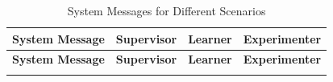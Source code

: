 \begin{longtable}{|>{\raggedright\arraybackslash}p{3cm}|>{\raggedright\arraybackslash}p{3.5cm}|>{\raggedright\arraybackslash}p{3.5cm}|>{\raggedright\arraybackslash}p{3.5cm}|}
\caption{System Messages for Different Scenarios} \label{tab:system_messages} \\

\hline
\textbf{System Message} & \textbf{Supervisor} & \textbf{Learner} & \textbf{Experimenter} \\
\hline
\endfirsthead

\hline
\textbf{System Message} & \textbf{Supervisor} & \textbf{Learner} & \textbf{Experimenter} \\
\hline
\endhead

\hline
\endfoot


\end{longtable}
